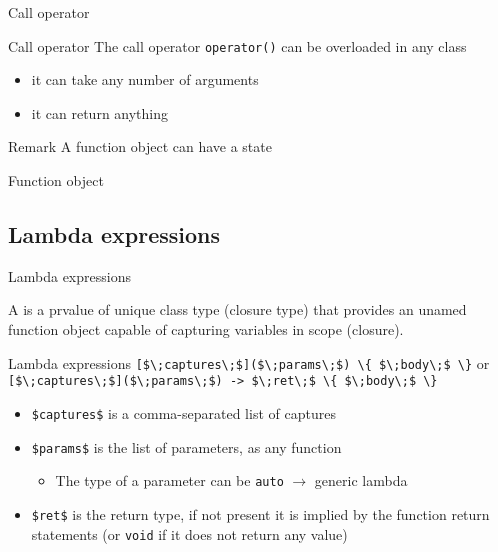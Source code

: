 \begin{frame}{Call operator}{}
  \begin{block}{Call operator}
    The call operator \lstinline!operator()! can be overloaded in any class
    \begin{itemize}
    \item
      it can take any number of arguments
    \item
      it can return anything
    \end{itemize}
  \end{block}

  \begin{block}{Remark}
    A function object can have a state
  \end{block}
\end{frame}

\begin{frame}{Function object}{}
  \begin{example}
  \end{example}
\end{frame}

\subsection{Lambda expressions}

\begin{frame}{Lambda expressions}{}
  \begin{definition}
    A  is a prvalue of unique class type (closure type) that provides an unamed function object capable of capturing variables in scope (closure).
  \end{definition}

  \begin{block}{Lambda expressions}
    {
      \hfill\lstinline[mathescape]![$\;captures\;$]($\;params\;$) \{ $\;body\;$ \}! or \lstinline[mathescape]![$\;captures\;$]($\;params\;$) -> $\;ret\;$ \{ $\;body\;$ \}!\hfill
    }
    \begin{itemize}
    \item
      \lstinline[mathescape]!$captures$! is a comma-separated list of captures
    \item
      \lstinline[mathescape]!$params$! is the list of parameters, as any function
      \begin{itemize}
      \item
        The type of a parameter can be \lstinline!auto! $\to$ generic lambda
      \end{itemize}
    \item
      \lstinline[mathescape]!$ret$! is the return type, if not present it is implied by the function return statements (or \lstinline!void! if it does not return any value)
    \end{itemize}
  \end{block}
\end{frame}

